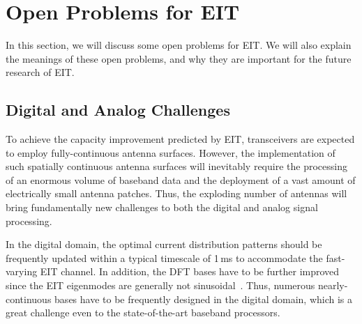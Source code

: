 \documentclass[journal,twocolumn]{IEEEtran}
\begin{document}


\section{Open Problems for EIT}
In this section, we will discuss some open problems for EIT. We will also explain the meanings of these open problems, and why they are important for the future research of EIT. 

\subsection{Digital and Analog Challenges}
To achieve the capacity improvement predicted by EIT, transceivers are expected to employ fully-continuous antenna surfaces. However, the implementation of such spatially continuous antenna surfaces will inevitably require the processing of an enormous volume of baseband data and the deployment of a vast amount of electrically small antenna patches. Thus, the exploding number of antennas will bring fundamentally new challenges to both the digital and analog signal processing. 

In the digital domain, the optimal current distribution patterns should be frequently updated within a typical timescale of 1\,ms to accommodate the fast-varying EIT channel. In addition, the DFT bases have to be further improved since the EIT eigenmodes are generally not sinusoidal~\cite{marzetta2022fourier}. Thus, numerous nearly-continuous bases have to be frequently designed in the digital domain, which is a great challenge even to the state-of-the-art baseband processors.  
\end{document}
